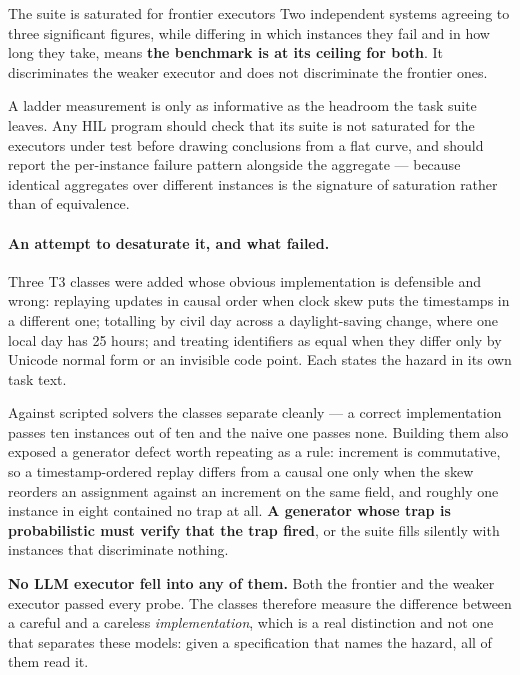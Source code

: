 \documentclass[11pt]{article}
\theoremstyle{definition}
\begin{document}
\begin{cautionbox}{The suite is saturated for frontier executors}
Two independent systems agreeing to three significant figures, while differing in which instances they fail and in how long they take, means \textbf{the benchmark is at its ceiling for both}. It discriminates the weaker executor and does not discriminate the frontier ones.

A ladder measurement is only as informative as the headroom the task suite leaves. Any HIL program should check that its suite is not saturated for the executors under test before drawing conclusions from a flat curve, and should report the per-instance failure pattern alongside the aggregate --- because identical aggregates over different instances is the signature of saturation rather than of equivalence.
\end{cautionbox}

\paragraph{An attempt to desaturate it, and what failed.} Three T3 classes were
added whose obvious implementation is defensible and wrong: replaying updates in
causal order when clock skew puts the timestamps in a different one; totalling by
civil day across a daylight-saving change, where one local day has 25 hours; and
treating identifiers as equal when they differ only by Unicode normal form or an
invisible code point. Each states the hazard in its own task text.

Against scripted solvers the classes separate cleanly --- a correct
implementation passes ten instances out of ten and the naive one passes none.
Building them also exposed a generator defect worth repeating as a rule:
increment is commutative, so a timestamp-ordered replay differs from a causal one
only when the skew reorders an assignment against an increment on the same field,
and roughly one instance in eight contained no trap at all. \textbf{A generator
whose trap is probabilistic must verify that the trap fired}, or the suite fills
silently with instances that discriminate nothing.

\textbf{No LLM executor fell into any of them.} Both the frontier and the weaker
executor passed every probe. The classes therefore measure the difference between
a careful and a careless \emph{implementation}, which is a real distinction and
not one that separates these models: given a specification that names the hazard,
all of them read it.
\end{document}
